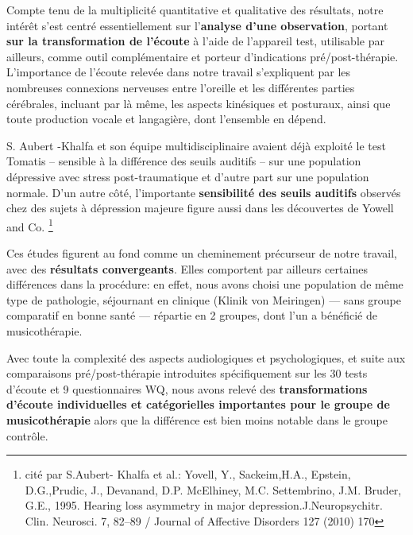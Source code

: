   Compte tenu de la multiplicité quantitative et qualitative des
  résultats, notre intérêt s'est centré essentiellement sur l'\textbf{analyse d'une
  observation}, portant \textbf{sur la transformation de l'écoute} à l'aide de
  l'appareil test, utilisable par ailleurs, comme outil complémentaire
  et porteur d'indications pré/post-thérapie.
  L'importance de l'écoute relevée dans notre travail
  s'expliquent par les nombreuses connexions nerveuses entre l'oreille et les
  différentes parties cérébrales, incluant par là même, les aspects kinésiques
  et posturaux, ainsi que toute production vocale et langagière,
  dont l'ensemble en dépend.



  S. Aubert -Khalfa et son équipe multidisciplinaire \autocite{affectiveDisorders} avaient déjà
  exploité le test Tomatis -- sensible à la différence des
  seuils auditifs -- sur une population
  dépressive avec stress post-traumatique et d'autre part sur une population normale.
  D'un autre côté, l'importante\textbf{ sensibilité des seuils auditifs }observés chez des
  sujets à dépression majeure figure aussi dans les découvertes de Yowell and Co.
  \autocite{affectiveDisorders}\footnote{cité
  par S.Aubert- Khalfa et al.: Yovell, Y.,
    Sackeim,H.A., Epstein, D.G.,Prudic, J., Devanand, D.P. McElhiney,
    M.C. Settembrino, J.M. Bruder, G.E., 1995. Hearing loss asymmetry in
    major depression.J.Neuropsychitr. Clin. Neurosci. 7, 82--89 / Journal of Affective Disorders 127
    (2010) 170}

  Ces études figurent au fond comme un cheminement précurseur de notre
  travail, avec des \textbf{résultats convergeants}. Elles comportent par ailleurs certaines différences dans la
   procédure:  %
   en effet, nous avons choisi
   une population de même type de pathologie, séjournant en clinique (Klinik von Meiringen) --- sans
   groupe comparatif en bonne santé --- répartie en 2 groupes,
  dont l'un a bénéficié de
  musicothérapie.



  Avec toute la
  complexité des aspects audiologiques et psychologiques,
  et suite aux comparaisons
  pré/post-thérapie introduites spécifiquement sur les 30 tests d'écoute et 9 questionnaires WQ, nous
  avons relevé des \textbf{transformations d'écoute
   individuelles et
  catégorielles importantes pour le groupe de musicothérapie} alors que
  la différence est bien moins notable dans le groupe contrôle.



